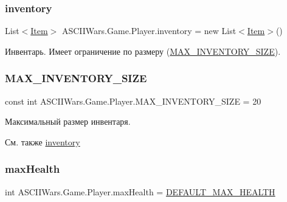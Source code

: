 \subsubsection{\texorpdfstring{inventory}{inventory}}
{\footnotesize\ttfamily List$<$\hyperlink{class_a_s_c_i_i_wars_1_1_game_1_1_item}{Item}$>$ A\+S\+C\+I\+I\+Wars.\+Game.\+Player.\+inventory = new List$<$\hyperlink{class_a_s_c_i_i_wars_1_1_game_1_1_item}{Item}$>$()}



Инвентарь. Имеет ограничение по размеру (\hyperlink{class_a_s_c_i_i_wars_1_1_game_1_1_player_a1cc8a05398a717bcf8c5a0ebd2ea0747}{M\+A\+X\+\_\+\+I\+N\+V\+E\+N\+T\+O\+R\+Y\+\_\+\+S\+I\+ZE}). 

\hypertarget{class_a_s_c_i_i_wars_1_1_game_1_1_player_a1cc8a05398a717bcf8c5a0ebd2ea0747}{}\label{class_a_s_c_i_i_wars_1_1_game_1_1_player_a1cc8a05398a717bcf8c5a0ebd2ea0747} 
\subsubsection{\texorpdfstring{M\+A\+X\+\_\+\+I\+N\+V\+E\+N\+T\+O\+R\+Y\+\_\+\+S\+I\+ZE}{MAX\_INVENTORY\_SIZE}}
{\footnotesize\ttfamily const int A\+S\+C\+I\+I\+Wars.\+Game.\+Player.\+M\+A\+X\+\_\+\+I\+N\+V\+E\+N\+T\+O\+R\+Y\+\_\+\+S\+I\+ZE = 20}



Максимальный размер инвентаря. 

\begin{DoxySeeAlso}{См. также}
\hyperlink{class_a_s_c_i_i_wars_1_1_game_1_1_player_a04acfaa196162f89bfae7aee5ec45480}{inventory} 
\end{DoxySeeAlso}
\hypertarget{class_a_s_c_i_i_wars_1_1_game_1_1_player_acfd121f865f0e5a87f177e93c82feadc}{}\label{class_a_s_c_i_i_wars_1_1_game_1_1_player_acfd121f865f0e5a87f177e93c82feadc} 
\subsubsection{\texorpdfstring{max\+Health}{maxHealth}}
{\footnotesize\ttfamily int A\+S\+C\+I\+I\+Wars.\+Game.\+Player.\+max\+Health = \hyperlink{class_a_s_c_i_i_wars_1_1_game_1_1_player_ab5921985db319187e317563c15ef48dc}{D\+E\+F\+A\+U\+L\+T\+\_\+\+M\+A\+X\+\_\+\+H\+E\+A\+L\+TH}}



